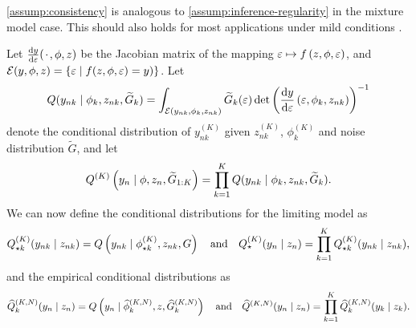 \cref{assump:consistency} is analogous to \cref{assump:inference-regularity} in the mixture model case. This should also holds for most applications under mild conditions
\citep{Zhao_ConvergenceAnalysisMU_2017,Devarajan_NMFdualdivergence_2019,Fu_IdentifiabilityNMF_2018,Anderson_AsymptoticFA_1988,Anderson_AsymptoticPCA_1963}. 

Let $\frac{\d{y}}{\d{\veps}}(\blank,{\phi},z)$ be the Jacobian matrix of the mapping ${\varepsilon}\mapsto f\left(z,{\phi},{\varepsilon}\right)$,
and $\mathcal{E}({y},{\phi},z)=\left\{{\varepsilon}\mid f(z,{\phi},{\varepsilon})={y})\right\}$. 
Let
\[
Q({y_{nk}}\mid{\phi}_{k},z_{nk},\widetilde{G}_{k}) %
  = \int_{\mathcal{E}\lrp{{y_{nk}},{\phi_{k}},z_{nk}}}
	\widetilde{G}_{k}({\veps})
	\det\lrp{\frac{\d{{y}}}{\d{\veps}}\lrp{{\veps},{\phi_{k}},z_{nk}}}\inv
\]
denote the conditional distribution of ${y}^{(K)}_{nk}$ 
given $z^{(K)}_{nk}$, ${\phi}^{(K)}_{k}$ and 
noise distribution $\widetilde{G}$,
and let 
\[
  Q^{(K)}\left(y_{n} \mid {\phi} , z_{n} , \widetilde{G}_{1:K}\right)=
  \prod_{k=1}^{K}Q({y}_{nk}\mid{\phi}_{k},z_{nk},\widetilde{G}_{k}). 
\]
We can now define the conditional distributions for the limiting model as 
\[
  Q^{(K)}_{\star k}({y_{nk}}\mid z_{nk}) = Q\left({y_{nk}}\mid{\phi}^{(K)}_{\star k},z_{nk},G\right)
  \quad\text{and}\quad
  Q^{(K)}_{\star}({y}_{n}\mid z_{n})=\prod^{K}_{k=1}Q^{(K)}_{\star k}({y}_{nk}\mid z_{nk}),
\]
and the empirical conditional distributions as 
\[
  \widehat{Q}^{(K,N)}_{k}({y_{n}}\mid z_{n}) = Q\left({y_{n}}\mid{\widehat{\phi}}^{(K,N)}_{k},z,\widehat{G}^{(K,N)}_{k}\right)
    \quad\text{and}\quad
  \widehat{Q}^{(K,N)}(y_{n}\mid z_{n}) =\prod^{K}_{k=1}\widehat{Q}^{(K,N)}_{k}({y}_{k}\mid z_{k}).
\]

